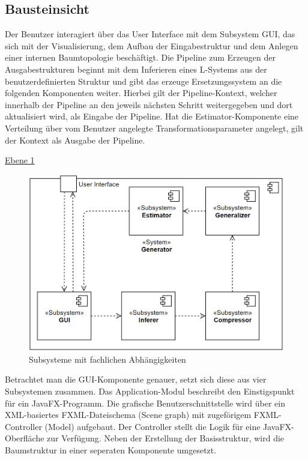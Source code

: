 \newpage

\subsection*{Bausteinsicht}
Der Benutzer interagiert über das User Interface mit dem Subsystem GUI, das sich mit der Visualisierung, dem Aufbau der
Eingabestruktur und dem Anlegen einer internen Baumtopologie beschäftigt.
Die Pipeline zum Erzeugen der Ausgabestrukturen beginnt mit dem Inferieren eines L-Systems aus der benutzerdefinierten
Struktur und gibt das erzeuge Ersetzungssystem an die folgenden Komponenten weiter.
Hierbei gilt der Pipeline-Kontext, welcher innerhalb der Pipeline an den jeweils nächsten Schritt weitergegeben und
dort aktualisiert wird, als Eingabe der Pipeline.
Hat die Estimator-Komponente eine Verteilung über vom Benutzer angelegte Transformationsparameter angelegt, gilt
der Kontext als Ausgabe der Pipeline.

\underline{Ebene 1}
\begin{figure}[H]
    \centering
    \includegraphics[width=12cm]{../images/Bausteinsicht_Ebene_1.PNG}
    \caption{Subsysteme mit fachlichen Abhängigkeiten}
\end{figure}

Betrachtet man die GUI-Komponente genauer, setzt sich diese aus vier Subsystemen zusammen.
Das Application-Modul beschreibt den Einstigspunkt für ein JavaFX-Programm.
Die grafische Benutzerschnittstelle wird über ein XML-basiertes FXML-Dateischema (Scene graph) mit zugeförigem FXML-Controller (Model)
aufgebaut.
Der Controller stellt die Logik für eine JavaFX-Oberfläche zur Verfügung.
Neben der Erstellung der Basisstruktur, wird die Baumstruktur in einer seperaten Komponente umgesetzt.

